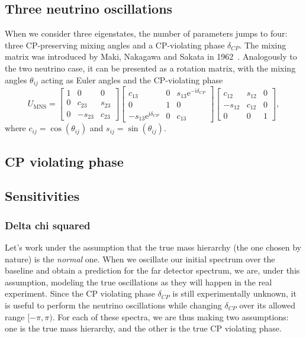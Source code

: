 \documentclass[10pt, a4paper]{article}
\newcommand{\me}{\mathrm{e}}
\newcommand{\mi}{\mathrm{i}}
\begin{document}
\subsection{Three neutrino oscillations}
When we consider three eigenstates, the number of parameters jumps to four:
three CP-preserving mixing angles and a CP-violating phase $\delta_{CP}$. The
mixing matrix was introduced by Maki, Nakagawa and Sakata in 1962~\cite{MNS}.
Analogously to the two neutrino case, it can be presented as a rotation matrix,
with the mixing angles $\theta_{ij}$ acting as Euler angles and the
CP-violating phase 
$$
U_{\mathrm{MNS}} = 
\begin{bmatrix} 1 & 0 & 0 \\ 0 & c_{23} & s_{23} \\ 0 & -s_{23} & c_{23} \end{bmatrix}
\begin{bmatrix} c_{13} & 0 & s_{13} \me^{-\mi \delta_{CP}} \\ 0 & 1 & 0 \\
								-s_{13} \me^{\mi \delta_{CP}} & 0 & c_{13} \end{bmatrix} 
\begin{bmatrix} c_{12} & s_{12} & 0 \\ -s_{12} & c_{12} & 0 \\ 0 & 0 & 1 \end{bmatrix}
,$$
where $c_{ij} = \cos(\theta_{ij})$ and $s_{ij} = \sin(\theta_{ij})$.

\subsection{CP violating phase}

\subsection{Sensitivities}


\subsubsection{Delta chi squared} 
Let's work under the assumption that the true mass hierarchy (the one chosen by
nature) is the \emph{normal} one. When we oscillate our initial spectrum over
the baseline and obtain a prediction for the far detector spectrum, we are,
under this assumption, modeling the true oscillations as they will happen in
the real experiment. Since the CP violating phase $\delta_{CP}$ is still
experimentally unknown, it is useful to perform the neutrino oscillations while
changing $\delta_{CP}$ over its allowed range $[-\pi,\pi)$. For each of these
spectra, we are thus making two assumptions: one is the true mass hierarchy,
and the other is the true CP violating phase.
\end{document}

